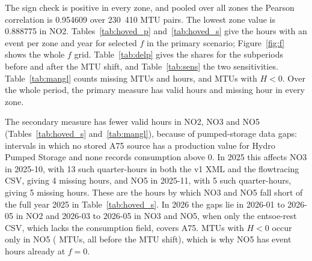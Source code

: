 The sign check is positive in every zone, and pooled over all zones the Pearson correlation is 0.954609 over 230~410 MTU pairs. %
The lowest zone value is 0.888775 in NO2. %
Tables~\ref{tab:hoved_p} and~\ref{tab:hoved_s} give the hours with an event per zone and year for selected $f$ in the primary scenario; Figure~\ref{fig:f} shows the whole $f$ grid.
Table~\ref{tab:delp} gives the shares for the subperiods before and after the MTU shift, and Table~\ref{tab:sens} the two sensitivities.
Table~\ref{tab:mangl} counts missing MTUs and hours, and MTUs with $H < 0$. %
Over the whole period, the primary measure has \resGyldigeTimerPrimaer{} valid hours and \resManglendeTimerPrimaer{} missing hour in every zone.

The secondary measure has fewer valid hours in NO2, NO3 and NO5 (Tables~\ref{tab:hoved_s} and~\ref{tab:mangl}), because of pumped-storage data gaps: intervals in which no stored A75 source has a production value for Hydro Pumped Storage and none records consumption above 0. %
In 2025 this affects NO3 in 2025-10, with 13 such quarter-hours in both the v1 XML and the flowtracing CSV, giving 4 missing hours, and NO5 in 2025-11, with 5 such quarter-hours, giving 5 missing hours. %
These are the hours by which NO3 and NO5 fall short of the full year 2025 in Table~\ref{tab:hoved_s}. %
In 2026 the gaps lie in 2026-01 to 2026-05 in NO2 and 2026-03 to 2026-05 in NO3 and NO5, when only the entsoe-rest CSV, which lacks the consumption field, covers A75. %
MTUs with $H < 0$ occur only in NO5 (\resHnegNOfive{} MTUs, all before the MTU shift), which is why NO5 has \resPrimNullFoer{} event hours already at $f = 0$. %

\begin{table}[p]
\centering
\caption{Hours with an event, primary measure, primary scenario ($b = 0.70$, 02.11 queue), per zone and calendar year. Part years are not scaled.} %
\label{tab:hoved_p}
\small

\end{table}

\begin{table}[p]
\centering
\caption{Hours with an event, secondary measure (optimistic upper bound), primary scenario, per zone and calendar year. Valid hours are fewer than in Table~\ref{tab:hoved_p} where pumped-storage data gaps make MTUs missing.}
\label{tab:hoved_s}
\small

\end{table}

